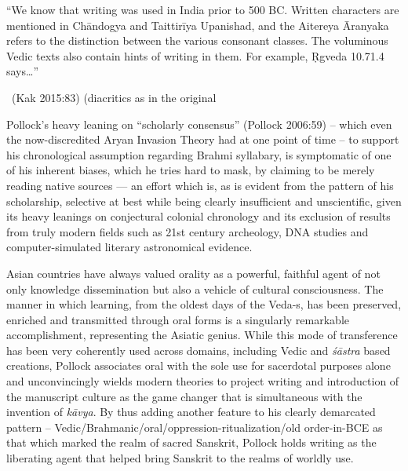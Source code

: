 \begin{myquote}
“We know that writing was used in India prior to 500 BC. Written characters are mentioned in Chāndogya and Taittirīya Upanishad, and the Aitereya Āranyaka refers to the distinction between the various consonant classes. The voluminous Vedic texts also contain hints of writing in them. For example, Ṛgveda 10.71.4 says…” 

~\hfill (Kak 2015:83) (diacritics as in the original
\end{myquote}

Pollock’s heavy leaning on “scholarly consensus” (Pollock 2006:59) – which even the now-discredited Aryan Invasion Theory had at one point of time – to support his chronological assumption regarding Brahmi syllabary, is symptomatic of one of his inherent biases, which he tries hard to mask, by claiming to be merely reading native sources — an effort which is, as is evident from the pattern of his scholarship, selective at best while being clearly insufficient and unscientific, given its heavy leanings on conjectural colonial chronology and its exclusion of results from truly modern fields such as 21st century archeology, DNA studies and computer-simulated literary astronomical evidence.

Asian countries have always valued orality as a powerful, faithful agent of not only knowledge dissemination but also a vehicle of cultural consciousness. The manner in which learning, from the oldest days of the Veda-s, has been preserved, enriched and transmitted through oral forms is a singularly remarkable accomplishment, representing the Asiatic genius. While this mode of transference has been very coherently used across domains, including Vedic and \textit{śāstra} based creations, Pollock associates oral with the sole use for sacerdotal purposes alone and unconvincingly wields modern theories to project writing and introduction of the manuscript culture as the game changer that is simultaneous with the invention of \textit{kāvya}. By thus adding another feature to his clearly demarcated pattern – Vedic/Brahmanic/oral/oppression-ritualization/old order-in-BCE as that which marked the realm of sacred Sanskrit, Pollock holds writing as the liberating agent that helped bring Sanskrit to the realms of worldly use.

